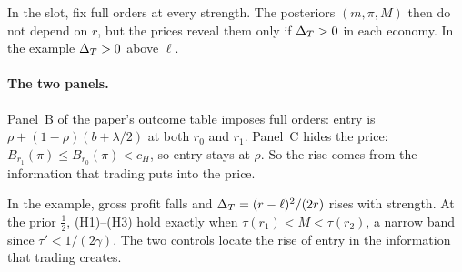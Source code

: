 \begin{watchout}
In the slot, fix full orders at every strength. The posteriors \((m,\pi,M)\) then do not depend on \(r\), but the
prices reveal them only if \(\Delta_T>0\) in each economy. In the example \(\Delta_T>0\) above \(\ell\).
\end{watchout}

\paragraph{The two panels.} Panel~B of the paper's outcome table imposes full orders: entry is
\(\rho+(1-\rho)(b+\lambda/2)\) at both \(r_0\) and \(r_1\). Panel~C hides the price: \(B_{r_1}(\pi)\le
B_{r_0}(\pi)<c_H\), so entry stays at \(\rho\). So the rise comes from the information that trading puts into the price.

\begin{chaptersummary}
In the example, gross profit falls and \(\Delta_T=(r-\ell)^2/(2r)\) rises with strength. At the prior \(\tfrac12\),
(H1)--(H3) hold exactly when \(\tau(r_1)<M<\tau(r_2)\), a narrow band since \(\tau'<1/(2\gamma)\). The two controls
locate the rise of entry in the information that trading creates.
\end{chaptersummary}
